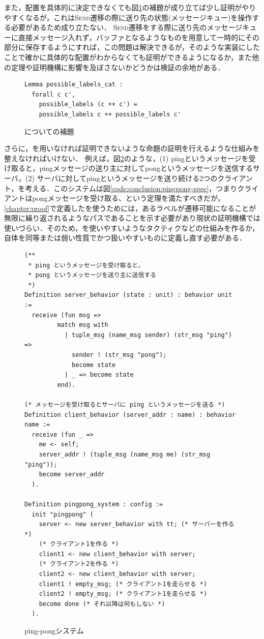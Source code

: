 また，配置を具体的に決定できなくても図\ref{code:conclusion:possible-labels-cat}の補題が成り立てば少し証明がやりやすくなるが，これは\textsc{Send}遷移の際に送り先の状態(メッセージキュー)を操作する必要があるため成り立たない．
\textsc{Send}遷移をする際に送り先のメッセージキューに直接メッセージ入れず，バッファとなるようなものを用意して一時的にその部分に保存するようにすれば，この問題は解決できるが，そのような実装にしたことで確かに具体的な配置がわからなくても証明ができるようになるか，また他の定理や証明機構に影響を及ぼさないかどうかは検証の余地がある．


\begin{figure}[tp]
\begin{lstlisting}
Lemma possible_labels_cat :
  forall c c',
    possible_labels (c ++ c') =
    possible_labels c ++ possible_labels c'
\end{lstlisting}
\caption{についての補題}\label{code:conclusion:possible-labels-cat}
\end{figure}


さらに，\fairness を用いなければ証明できないような命題の証明を行えるような仕組みを整えなければいけない．
例えば，図\ref{code:conclusion:pingpong}のような，(1) pingというメッセージを受け取ると，pingメッセージの送り主に対してpongというメッセージを送信するサーバ，(2) サーバに対してpingというメッセージを送り続ける2つのクライアント，を考える．このシステムは図\ref{code:conclusion:pingpong-spec}，つまりクライアントはpongメッセージを受け取る、という定理を満たすべきだが，
\ref{chapter:proof}で定義したを使うためには，あるラベルが遷移可能になることが無限に繰り返されるようなパスであることを示す必要があり現状の証明機構では使いづらい．そのため，を使いやすいようなタクティクなどの仕組みを作るか，自体を同等または弱い性質でかつ扱いやすいものに定義し直す必要がある．

\begin{figure}[tp]
\begin{lstlisting}
(**
 * ping というメッセージを受け取ると，
 * pong というメッセージを送り主に送信する
 *)
Definition server_behavior (state : unit) : behavior unit :=
  receive (fun msg =>
         match msg with
           | tuple_msg (name_msg sender) (str_msg "ping") =>
             sender ! (str_msg "pong");
             become state
           | _ => become state
         end).

(* メッセージを受け取るとサーバに ping というメッセージを送る *)
Definition client_behavior (server_addr : name) : behavior name :=
  receive (fun _ =>
    me <- self;
    server_addr ! (tuple_msg (name_msg me) (str_msg "ping"));
    become server_addr
  ).

Definition pingpong_system : config :=
  init "pingpong" (
    server <- new server_behavior with tt; (* サーバーを作る *)
    (* クライアント1を作る *)
    client1 <- new client_behavior with server;
    (* クライアント2を作る *)
    client2 <- new client_behavior with server;
    client1 ! empty_msg; (* クライアント1を走らせる *)
    client2 ! empty_msg; (* クライアント1を走らせる *)
    become done (* それ以降は何もしない *)
  ).
\end{lstlisting}
  \caption{ping-pongシステム}\label{code:conclusion:pingpong}
\end{figure}

